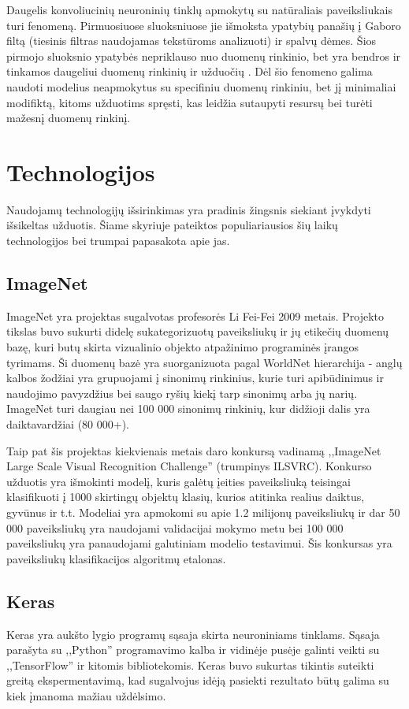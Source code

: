 \documentclass{VUMIFPSkursinis}
\begin{document}
Daugelis konvoliucinių neuroninių tinklų apmokytų su natūraliais paveiksliukais turi fenomeną. Pirmuosiuose sluoksniuose jie išmoksta ypatybių panašių į Gaboro filtą 
(tiesinis filtras naudojamas tekstūroms analizuoti) ir spalvų dėmes. Šios pirmojo sluoksnio ypatybės nepriklauso nuo duomenų rinkinio, bet yra bendros ir tinkamos 
daugeliui duomenų rinkinių ir užduočių \cite{DBLP:journals/corr/YosinskiCBL14}. Dėl šio fenomeno galima naudoti modelius neapmokytus su specifiniu duomenų rinkiniu, 
bet jį minimaliai modifiktą, kitoms užduotims spręsti, kas leidžia sutaupyti resursų bei turėti mažesnį duomenų rinkinį.

\section{Technologijos}
Naudojamų technologijų išsirinkimas yra pradinis žingsnis siekiant įvykdyti išsikeltas užduotis. Šiame skyriuje pateiktos populiariausios šių laikų technologijos 
bei trumpai papasakota apie jas.

\subsection{ImageNet}
ImageNet yra projektas sugalvotas profesorės Li Fei-Fei 2009 metais. Projekto tikslas buvo sukurti didelę sukategorizuotų paveiksliukų ir jų etikečių duomenų bazę, 
kuri butų skirta vizualinio objekto atpažinimo programinės įrangos tyrimams. Ši duomenų bazė yra suorganizuota pagal WorldNet hierarchija - anglų kalbos žodžiai 
yra grupuojami į sinonimų rinkinius, kurie turi apibūdinimus ir naudojimo pavyzdžius bei saugo ryšių kiekį tarp sinonimų arba jų narių. ImageNet turi daugiau nei 
100 000 sinonimų rinkinių, kur didžioji dalis yra daiktavardžiai (80 000+). 

Taip pat šis projektas kiekvienais metais daro konkursą vadinamą ,,ImageNet Large Scale Visual Recognition Challenge'' (trumpinys ILSVRC). Konkurso užduotis yra 
išmokinti modelį, kuris galėtų įeities paveiksliuką teisingai klasifikuoti į 1000 skirtingų objektų klasių, kurios atitinka realius daiktus, gyvūnus ir t.t. Modeliai 
yra apmokomi su apie 1.2 milijonų paveiksliukų ir dar 50 000 paveiksliukų yra naudojami validacijai mokymo metu bei 100 000 paveiksliukų yra panaudojami galutiniam 
modelio testavimui. Šis konkursas yra paveiksliukų klasifikacijos algoritmų etalonas.

\subsection{Keras}
Keras yra aukšto lygio programų sąsaja skirta neuroniniams tinklams. Sąsaja parašyta su ,,Python'' programavimo kalba ir vidinėje pusėje galinti veikti su ,,TensorFlow'' 
ir kitomis bibliotekomis. Keras buvo sukurtas tikintis suteikti greitą ekspermentavimą, kad sugalvojus idėją pasiekti rezultato būtų galima su kiek įmanoma mažiau uždėlsimo.
\end{document}
